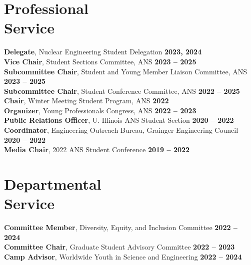 \documentclass[margin,line]{resume}
\begin{document}
\begin{resume}
    \section{\mysidestyle Professional\\Service}
    \textbf{Delegate}, Nuclear Engineering Student Delegation \hfill \textbf{2023, 2024}\vspace{.5mm}\\%
    \textbf{Vice Chair}, Student Sections Committee, ANS \hfill \textbf{2023 -- 2025}\vspace{.5mm}\\%
    \textbf{Subcommittee Chair}, Student and Young Member Liaison Committee, ANS \hfill \textbf{2023 -- 2025}\vspace{.5mm}\\%
    \textbf{Subcommittee Chair}, Student Conference Committee, ANS \hfill \textbf{2022 -- 2025}\vspace{.5mm}\\%
                \textbf{Chair}, Winter Meeting Student Program, ANS \hfill \textbf{2022}\vspace{.5mm}\\%
    \textbf{Organizer}, Young Professionals Congress, ANS \hfill \textbf{2022 -- 2023}\vspace{.5mm}\\%
                \textbf{Public Relations Officer}, U. Illinois ANS Student Section  \hfill \textbf{2020 -- 2022}\vspace{.5mm}\\%
    \textbf{Coordinator}, Engineering Outreach Bureau, Grainger Engineering Council \hfill \textbf{2020 -- 2022}\vspace{.5mm}\\%
                \textbf{Media Chair}, 2022 ANS Student Conference \hfill \textbf{2019 -- 2022}\vspace{.5mm}\\%
    \section{\mysidestyle Departmental\\Service}
                \textbf{Committee Member}, Diversity, Equity, and Inclusion Committee \hfill \textbf{2022 -- 2024}\vspace{.5mm}\\%
                \textbf{Committee Chair}, Graduate Student Advisory Committee \hfill \textbf{2022 -- 2023}\vspace{.5mm}\\%
                \textbf{Camp Advisor}, Worldwide Youth in Science and Engineering \hfill \textbf{2022 -- 2024}\vspace{.5mm}\\%


\end{resume}
\end{document}
